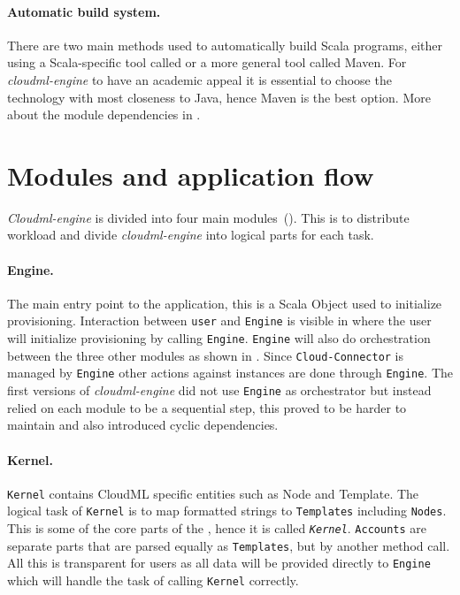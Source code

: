 \paragraph{Automatic build system.}

There are two main methods used to automatically build Scala programs, 
either using a Scala-specific tool called  or a more general tool called Maven. 
For \emph{cloudml-engine} to have an academic appeal it is essential to choose the technology
with most closeness to Java, hence Maven is the best option.
More about the module dependencies in .

\section{Modules and application flow}



\emph{Cloudml-engine} is divided into four main modules~().
This is to distribute workload and divide \emph{cloudml-engine} into logical parts for each task.

\paragraph{Engine.} 






The main entry point to the application, this is a Scala Object used to initialize provisioning.
Interaction between \texttt{user} and \texttt{Engine} is visible in  
where the user will initialize provisioning by calling \texttt{Engine}.
\texttt{Engine} will also do orchestration between the three other modules
as shown in .
Since \texttt{Cloud-Connector} is managed by \texttt{Engine} other actions against 
instances are done through \texttt{Engine}.
The first versions of \emph{cloudml-engine} did not use \texttt{Engine} as orchestrator but
instead relied on each module to be a sequential step, this proved to be harder to maintain
and also introduced cyclic dependencies.

\paragraph{Kernel.} 

\texttt{Kernel} contains CloudML specific entities such as Node and Template.
The logical task of \texttt{Kernel} is to map  formatted strings to 
\texttt{Templates} including \texttt{Nodes}.
This is some of the core parts of the , hence it is called \emph{\texttt{Kernel}}.
\texttt{Accounts} are separate parts that are parsed equally as \texttt{Templates},
 but by another method call. All this is transparent for users as all data will
be provided directly to \texttt{Engine} which will handle the task
of calling \texttt{Kernel} correctly.

